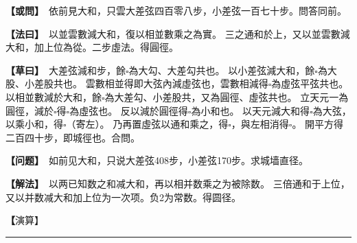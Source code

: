 \documentclass[11pt,a4paper]{article}
\let\origsquare\square
\renewcommand{\square}{\ensuremath{\origsquare}}%
\newcommand{\longline}{\noindent\rule{\textwidth}{0.4pt}}
\newcommand{\clOWEN}[1]{%
  \par\vspace{0.3em}%
  \noindent\textcolor{problemcolor}{\textbf{【或問】}}\,{\tradfont #1}\par\nopagebreak%
}
\newcommand{\mdOWEN}[1]{%
  \par\vspace{0.3em}%
  \noindent\textcolor{problemcolor}{\textbf{【问题】}}\,{\modfont #1}\par\nopagebreak%
}
\newcommand{\clFAYUE}[1]{%
  \par\noindent\textcolor{methodcolor}{\textbf{【法曰】}}\,{\tradfont #1}\par\nopagebreak%
}
\newcommand{\mdFAYUE}[1]{%
  \par\noindent\textcolor{methodcolor}{\textbf{【解法】}}\,{\modfont #1}\par\nopagebreak%
}
\newcommand{\clTSAOYUE}[1]{%
  \par\noindent\textcolor{workcolor}{\textbf{【草曰】}}\,{\tradfont #1}\par%
}
\newcommand{\mdTSAOYUE}[1]{%
  \par\noindent\textcolor{workcolor}{\textbf【演算】}}\,{\modfont #1}\par%
\begin{document}
\begin{paracol}{2}

\begin{leftcolumn}
\clOWEN{%
依前見大和，只雲大差弦四百零八步，小差弦一百七十步。問答同前。}

\clFAYUE{%
以並雲數減大和，復以相並數乘之為實。
三之通和於上，又以並雲數減大和，加上位為從。二步虛法。得圓徑。}

\clTSAOYUE{%
大差弦減和步，餘$\square$為大勾、大差勾共也。
以小差弦減大和，餘$\square$為大股、小差股共也。
雲數相並得即大弦內減虛弦也，雲數相減得$\square$為虛弦平弦共也。
以相並數減於大和，餘$\square$為大差勾、小差股共，又為圓徑、虛弦共也。
立天元一為圓徑，減於$\square$得$\square$為虛弦也。
反以減於圓徑得$\square$為小和也。
以天元減大和得$\square$為大弦，以乘小和，得$\square$（寄左）。
乃再置虛弦以通和乘之，得$\square$，與左相消得$\square$。
開平方得二百四十步，即城徑也。合問。}
\end{leftcolumn}

\switchcolumn

\begin{rightcolumn}
\mdOWEN{%
如前见大和，只说大差弦408步，小差弦170步。求城墙直径。}

\mdFAYUE{%
以两已知数之和减大和，再以相并数乘之为被除数。
三倍通和于上位，又以并数减大和加上位为一次项。负2为常数。得圆径。}

\mdTSAOYUE{%
大差弦减和步余$\square$为大勾、大差勾之和。
以小差弦减大和余$\square$为大股、小差股之和。
两数相并得即大弦内减虚弦，相减得$\square$为虚弦平弦之和。
以相并数减于大和余$\square$为大差勾、小差股之和，又为圆径、虚弦之和。
设天元一为圆径，从$\square$中减去得$\square$为虚弦。
反过来从圆径中减去得$\square$为小和。
天元减大和得$\square$为大弦，乘小和得$\square$（寄左）。
再取虚弦以通和乘之得$\square$，与左式相消得$\square$。
开平方得240步即城径。符合所问。}
\end{rightcolumn}

\end{paracol}

\vspace{0.3cm}
\begin{center}\longline\end{center}
\end{document}
